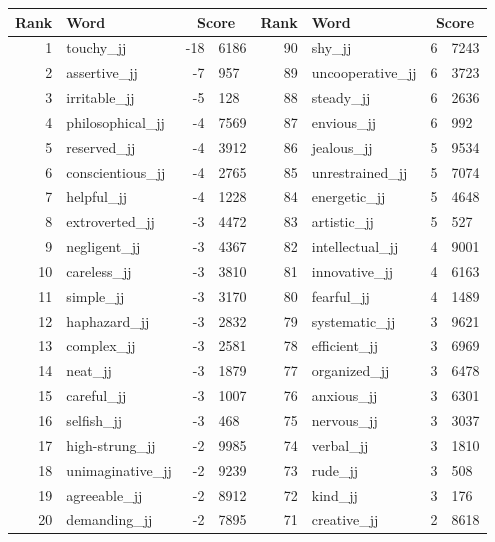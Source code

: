 \begin{table}[tbp]
    \begin{tabular}{| rlr@{.}l | rlr@{.}l |}
    \hline
    \textbf{Rank} & \textbf{Word} & \multicolumn{2}{c|}{\textbf{Score}} & \textbf{Rank} & \textbf{Word} & \multicolumn{2}{c|}{\textbf{Score}} \\
    \hline
    1 & touchy\_jj & -18 & 6186    &    90 & shy\_jj & 6 & 7243 \\
    2 & assertive\_jj & -7 & 957    &    89 & uncooperative\_jj & 6 & 3723 \\
    3 & irritable\_jj & -5 & 128    &    88 & steady\_jj & 6 & 2636 \\
    4 & philosophical\_jj & -4 & 7569    &    87 & envious\_jj & 6 & 992 \\
    5 & reserved\_jj & -4 & 3912    &    86 & jealous\_jj & 5 & 9534 \\
    6 & conscientious\_jj & -4 & 2765    &    85 & unrestrained\_jj & 5 & 7074 \\
    7 & helpful\_jj & -4 & 1228    &    84 & energetic\_jj & 5 & 4648 \\
    8 & extroverted\_jj & -3 & 4472    &    83 & artistic\_jj & 5 & 527 \\
    9 & negligent\_jj & -3 & 4367    &    82 & intellectual\_jj & 4 & 9001 \\
    10 & careless\_jj & -3 & 3810    &    81 & innovative\_jj & 4 & 6163 \\
    11 & simple\_jj & -3 & 3170    &    80 & fearful\_jj & 4 & 1489 \\
    12 & haphazard\_jj & -3 & 2832    &    79 & systematic\_jj & 3 & 9621 \\
    13 & complex\_jj & -3 & 2581    &    78 & efficient\_jj & 3 & 6969 \\
    14 & neat\_jj & -3 & 1879    &    77 & organized\_jj & 3 & 6478 \\
    15 & careful\_jj & -3 & 1007    &    76 & anxious\_jj & 3 & 6301 \\
    16 & selfish\_jj & -3 & 468    &    75 & nervous\_jj & 3 & 3037 \\
    17 & high-strung\_jj & -2 & 9985    &    74 & verbal\_jj & 3 & 1810 \\
    18 & unimaginative\_jj & -2 & 9239    &    73 & rude\_jj & 3 & 508 \\
    19 & agreeable\_jj & -2 & 8912    &    72 & kind\_jj & 3 & 176 \\
    20 & demanding\_jj & -2 & 7895    &    71 & creative\_jj & 2 & 8618 \\

\end{tabular}
\end{table}
